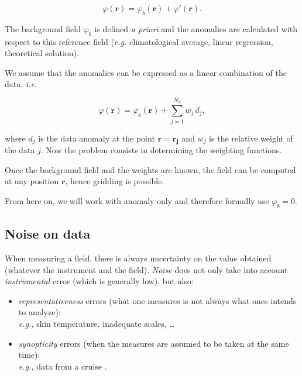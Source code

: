 \begin{equation}
 \varphi(\mathbf{r}) = \varphi_b(\mathbf{r}) + \varphi'(\mathbf{r}).
 \label{background}
\end{equation}

The background field $\varphi_b$ is defined {\it a priori} and the anomalies are calculated with respect to this reference field (\textit{e.g.} climatological average, linear regression, theoretical solution). 

We assume that the anomalies can be expressed as a linear combination of the data, \textit{i.e.}

\begin{equation}
\varphi(\mathbf{r}) = \varphi_b(\mathbf{r}) + \sum_{j=1}^{N_d} w_j\, d_j,
\label{objectiveanal}
\end{equation}

where $d_{j}$ is the data anomaly at the point $\mathbf{r}= \mathbf{r_{j}}$ and $w_j$ is the relative weight of the data $j$. Now the problem consists in determining the weighting functions. 

Once the background field and the weights are known, the field can be computed at any position $\mathbf{r}$, hence gridding is possible.

From here on, we will work with anomaly only and therefore formally use $\varphi_{b}=0$.


\subsection{Noise on data}

When measuring a field, there is always uncertainty on the value obtained (whatever the instrument and the field). \textit{Noise} does not only take into account \textit{instrumental} error (which is generally low), but also:
\begin{itemize}
\item \textit{representativeness} errors (what one measures is not always what ones intends to analyze):\\
\textit{e.g.,} skin temperature, inadequate scales, \ldots
\item \textit{synopticity} errors (when the measures are assumed to be taken at the same time):\\
\textit{e.g.,} data from a cruise \citep{RIXEN01}.
\end{itemize}

